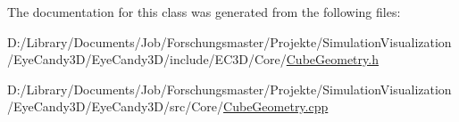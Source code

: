 The documentation for this class was generated from the following files\+:\begin{DoxyCompactItemize}
\item 
D\+:/\+Library/\+Documents/\+Job/\+Forschungsmaster/\+Projekte/\+Simulation\+Visualization/\+Eye\+Candy3\+D/\+Eye\+Candy3\+D/include/\+E\+C3\+D/\+Core/\mbox{\hyperlink{_cube_geometry_8h}{Cube\+Geometry.\+h}}\item 
D\+:/\+Library/\+Documents/\+Job/\+Forschungsmaster/\+Projekte/\+Simulation\+Visualization/\+Eye\+Candy3\+D/\+Eye\+Candy3\+D/src/\+Core/\mbox{\hyperlink{_cube_geometry_8cpp}{Cube\+Geometry.\+cpp}}\end{DoxyCompactItemize}
